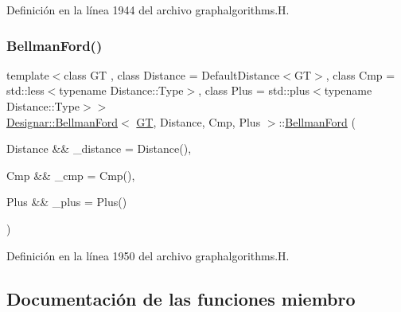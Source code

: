 Definición en la línea 1944 del archivo graphalgorithms.\+H.

\mbox{\label{class_designar_1_1_bellman_ford_adfac9f09fe6da285aaa8f8d84e9d7982}} 
\subsubsection{\texorpdfstring{Bellman\+Ford()}{BellmanFord()}\hspace{0.1cm}{\footnotesize\ttfamily [2/2]}}
{\footnotesize\ttfamily template$<$class GT , class Distance  = Default\+Distance$<$\+G\+T$>$, class Cmp  = std\+::less$<$typename Distance\+::\+Type$>$, class Plus  = std\+::plus$<$typename Distance\+::\+Type$>$$>$ \\
\hyperlink{class_designar_1_1_bellman_ford}{Designar\+::\+Bellman\+Ford}$<$ \hyperlink{demo-buildgraph_8_c_a3001c40d2c31ca87ed96cd7d1334a55e}{GT}, Distance, Cmp, Plus $>$\+::\hyperlink{class_designar_1_1_bellman_ford}{Bellman\+Ford} (\begin{DoxyParamCaption}\item[{Distance \&\&}]{\+\_\+distance = {\ttfamily Distance()},  }\item[{Cmp \&\&}]{\+\_\+cmp = {\ttfamily Cmp()},  }\item[{Plus \&\&}]{\+\_\+plus = {\ttfamily Plus()} }\end{DoxyParamCaption})\hspace{0.3cm}{\ttfamily [inline]}}



Definición en la línea 1950 del archivo graphalgorithms.\+H.



\subsection{Documentación de las funciones miembro}
\mbox{\label{class_designar_1_1_bellman_ford_a3057f65cedb7e6d214ed838c810b557e}} 
